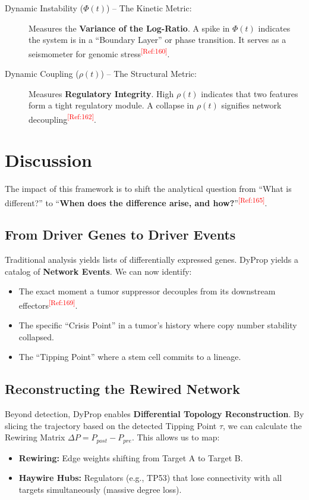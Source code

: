 \documentclass[11pt, a4paper]{article}
\newcommand{\tref}[1]{\textsuperscript{\textcolor{red}{[Ref:#1]}}}
\begin{document}
\begin{description}
    \item[Dynamic Instability ($\Phi(t)$) -- The Kinetic Metric:] Measures the \textbf{Variance of the Log-Ratio}. A spike in $\Phi(t)$ indicates the system is in a ``Boundary Layer'' or phase transition. It serves as a seismometer for genomic stress\tref{160}.
    \item[Dynamic Coupling ($\rho(t)$) -- The Structural Metric:] Measures \textbf{Regulatory Integrity}. High $\rho(t)$ indicates that two features form a tight regulatory module. A collapse in $\rho(t)$ signifies network decoupling\tref{162}.
\end{description}

\section{Discussion}

The impact of this framework is to shift the analytical question from ``What is different?'' to ``\textbf{When does the difference arise, and how?}''\tref{165}.

\subsection{From Driver Genes to Driver Events}
Traditional analysis yields lists of differentially expressed genes. DyProp yields a catalog of \textbf{Network Events}. We can now identify:
\begin{itemize}
    \item The exact moment a tumor suppressor decouples from its downstream effectors\tref{169}.
    \item The specific ``Crisis Point'' in a tumor's history where copy number stability collapsed.
    \item The ``Tipping Point'' where a stem cell commits to a lineage.
\end{itemize}

\subsection{Reconstructing the Rewired Network}
Beyond detection, DyProp enables \textbf{Differential Topology Reconstruction}. By slicing the trajectory based on the detected Tipping Point $\tau$, we can calculate the Rewiring Matrix $\Delta P = P_{post} - P_{pre}$. This allows us to map:
\begin{itemize}
    \item \textbf{Rewiring:} Edge weights shifting from Target A to Target B.
    \item \textbf{Haywire Hubs:} Regulators (e.g., TP53) that lose connectivity with all targets simultaneously (massive degree loss).
\end{itemize}
\end{document}
